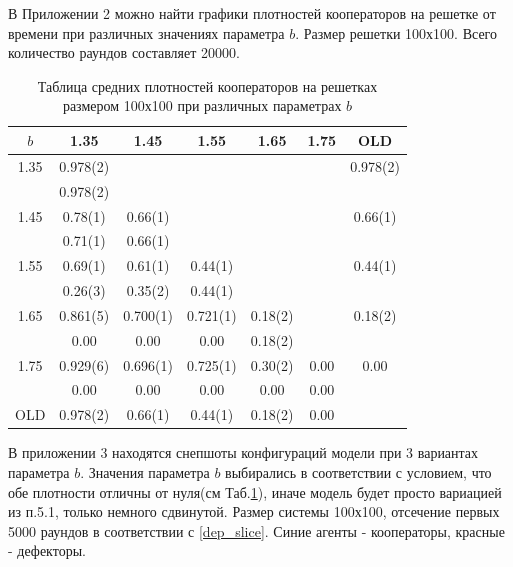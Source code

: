 \documentclass[a4paper]{article}
\begin{document}
	
	В Приложении 2 можно найти графики плотностей кооператоров на решетке от времени при различных значениях параметра $b$. Размер решетки 100х100. Всего количество раундов составляет 20000.
	
	\begin{table}
			\centering
		\begin{tabular}{|c|c|c|c|c|c|c|}
			\hline 
			$b$ & 1.35 & 1.45 & 1.55 & 1.65 & 1.75 & OLD \\ 
			\hline 
			1.35 & 0.978(2) &  &  &  &  & 0.978(2) \\ 
			& 0.978(2) &  &  &  &  &  \\ 
			\hline 
			1.45 & 0.78(1) & 0.66(1) &  &  &  & 0.66(1) \\
			& 0.71(1) & 0.66(1) &  &  &  &  \\ 
			\hline 
			1.55 & 0.69(1) & 0.61(1) & 0.44(1) &  &  & 0.44(1) \\
			& 0.26(3) & 0.35(2) & 0.44(1) &  &  &  \\  
			\hline 
			1.65 & 0.861(5) & 0.700(1) & 0.721(1) & 0.18(2)	 &  & 0.18(2)	 \\
			& 0.00  & 0.00 & 0.00 & 0.18(2) &  &  \\  
			\hline 
			1.75 & 0.929(6) & 0.696(1) & 0.725(1) & 0.30(2)  & 0.00 & 0.00 \\
			& 0.00 & 0.00 & 0.00 & 0.00 & 0.00 &  \\ 
			\hline 
			OLD & 0.978(2) & 0.66(1) & 0.44(1) & 0.18(2) & 0.00 &  \\ 
			\hline 
		\end{tabular}
		\caption{Таблица средних плотностей кооператоров на решетках размером 100х100 при различных параметрах $b$}
		\label{dep_freq} 
	\end{table}
	
	\par В приложении 3 находятся снепшоты конфигураций модели при 3 вариантах параметра $b$. Значения параметра $b$ выбирались в соответствии с условием, что обе плотности отличны от нуля(см Таб.\ref{dep_freq}), иначе модель будет просто вариацией из п.5.1, только немного сдвинутой. Размер системы 100х100, отсечение первых 5000 раундов в соответствии с \ref{dep_slice}. Синие агенты - кооператоры, красные - дефекторы.
	
\end{document}
